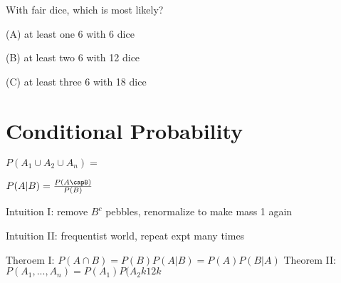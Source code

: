 \documentclass[12pt]{article}
\begin{document}
With fair dice, which is most likely?

(A) at least one 6 with 6 dice

(B) at least two 6 with 12 dice

(C) at least three 6 with 18 dice

\section{Conditional Probability}

$P(A_1\cup A_2\cup A_n) = $

$P(A|B) = \frac{P(A\capB)}{P(B)}$

Intuition I:
remove $B^c$ pebbles, renormalize to make mass 1 again

Intuition II:
frequentist world, repeat expt many times


Theroem I: $P(A \cap B) = P(B)P(A|B) = P(A)P(B|A)$
Theorem II: $P(A_1,...,A_n) = P(A_1)P(A_2k12k$
\end{document}
